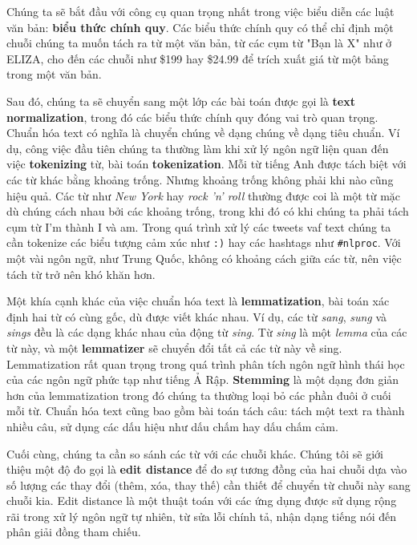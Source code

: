 Chúng ta sẽ bắt đầu với công cụ quan trọng nhất trong việc biểu diễn các luật văn bản: \textbf{biểu thức chính quy}. Các biểu thức chính quy có thể chỉ định một chuỗi chúng ta muốn tách ra từ một văn bản, từ các cụm từ "Bạn là X" như ở ELIZA, cho đến các chuỗi như \$199 hay \$24.99 để trích xuất giá từ một bảng trong một văn bản.

Sau đó, chúng ta sẽ chuyển sang một lớp các bài toán được gọi là \textbf{text normalization}, trong đó các biểu thức chính quy đóng vai trò quan trọng. Chuẩn hóa text có nghĩa là chuyển chúng về dạng chúng về dạng tiêu chuẩn. Ví dụ, công việc đầu tiên chúng ta thường làm khi xử lý ngôn ngữ liện quan đến việc \textbf{tokenizing} từ, bài toán \textbf{tokenization}. Mỗi từ tiếng Anh được tách biệt với các từ khác bằng khoảng trống. Nhưng khoảng trống không phải khi nào cũng hiệu quả. Các từ như \textit{New York} hay \textit{rock 'n' roll} thường được coi là một từ mặc dù chúng cách nhau bởi các khoảng trống, trong khi đó có khi chúng ta phải tách cụm từ I'm thành I và am. Trong quá trình xử lý các tweets vaf text chúng ta cần tokenize các biểu tượng cảm xúc như \verb|:)| hay các hashtags như \verb|#nlproc|. Với một vài ngôn ngữ, như Trung Quốc, không có khoảng cách giữa các từ, nên việc tách từ trở nên khó khăn hơn.

Một khía cạnh khác của việc chuẩn hóa text là \textbf{lemmatization}, bài toán xác định hai từ có cùng gốc, dù được viết khác nhau. Ví dụ, các từ \textit{sang}, \textit{sung} và \textit{sings} đều là các dạng khác nhau của động từ \textit{sing}. Từ \textit{sing} là một \textit{lemma} của các từ này, và một \textbf{lemmatizer} sẽ chuyển đổi tất cả các từ này về sing. Lemmatization rất quan trọng trong quá trình phân tích ngôn ngữ hình thái học của các ngôn ngữ phức tạp như tiếng Ả Rập. \textbf{Stemming} là một dạng đơn giản hơn của lemmatization trong đó chúng ta thường loại bỏ các phần đuôi ở cuối mỗi từ. Chuẩn hóa text cũng bao gồm bài toán tách câu: tách một text ra thành nhiều câu, sử dụng các dấu hiệu như dấu chấm hay dấu chấm cảm.

Cuối cùng, chúng ta cần so sánh các từ với các chuỗi khác. Chúng tôi sẽ giới thiệu một độ đo gọi là \textbf{edit distance} để đo sự tương đồng của hai chuỗi dựa vào số lượng các thay đổi (thêm, xóa, thay thế) cần thiết để chuyển từ chuỗi này sang chuỗi kia. Edit distance là một thuật toán với các ứng dụng được sử dụng rộng rãi trong xử lý ngôn ngữ tự nhiên, từ sửa lỗi chính tả, nhận dạng tiếng nói đến phân giải đồng tham chiếu.


